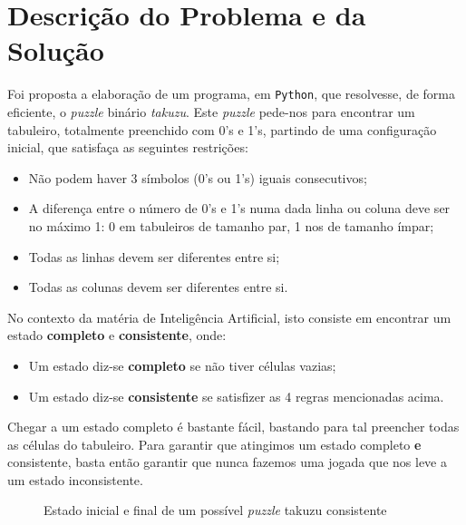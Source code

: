 \documentclass[12pt,a4paper]{article}
\begin{document}
\section*{Descrição do Problema e da Solução}

Foi proposta a elaboração de um programa, em \texttt{Python}, que resolvesse, de forma eficiente, o \textit{puzzle} binário \textit{takuzu}.
 Este \textit{puzzle} pede-nos para encontrar um tabuleiro, totalmente preenchido com 0's e 1's, partindo de uma configuração inicial, que satisfaça as seguintes restrições:
\begin{itemize}
      \item Não podem haver 3 símbolos (0's ou 1's) iguais consecutivos;
      \item A diferença entre o número de 0's e 1's numa dada linha ou coluna deve ser no máximo 1: 0 em tabuleiros de tamanho par, 1 nos de tamanho ímpar;
      \item Todas as linhas devem ser diferentes entre si;
      \item Todas as colunas devem ser diferentes entre si.
\end{itemize}

No contexto da matéria de Inteligência Artificial, isto consiste em encontrar um estado \textbf{completo} e \textbf{consistente}, onde:
\begin{itemize}
      \item Um estado diz-se \textbf{completo} se não tiver células vazias;
      \item Um estado diz-se \textbf{consistente} se satisfizer as 4 regras mencionadas acima.
\end{itemize}

Chegar a um estado completo é bastante fácil, bastando para tal preencher todas as células do tabuleiro.
 Para garantir que atingimos um estado completo \textbf{e} consistente, basta então garantir que nunca fazemos uma jogada que nos leve a um estado inconsistente.


\begin{figure}[H]
      \centering
      
      \hspace*{1cm}
      
      \caption{Estado inicial e final de um possível \textit{puzzle} takuzu consistente}
      \label{fig:takuzu-initial-state}
\end{figure}
\end{document}
